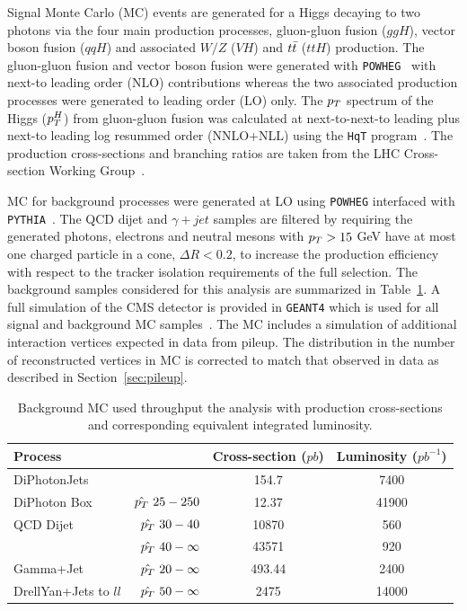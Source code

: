 Signal Monte Carlo (MC) events are generated for a Higgs decaying to two photons via the four main 
production processes, gluon-gluon fusion ($ggH$), vector boson fusion ($qqH$) and associated $W/Z$ ($VH$) 
and $t\bar{t}$ ($ttH$) production.
The gluon-gluon fusion and vector boson fusion were generated with \texttt{POWHEG}~\cite{powheg} with 
next-to leading order (NLO) contributions whereas
the two associated production processes were generated to leading order (LO) only.
The $p_{T}$ spectrum of the Higgs ($p_{T}^{H}$) from gluon-gluon fusion was calculated at
next-to-next-to leading plus next-to leading log resummed order (NNLO+NLL) using the \texttt{HqT} program~\cite{hqt}.
The production cross-sections and branching ratios are taken from the LHC Cross-section Working Group~\cite{lhcxswg}.

MC for background processes were generated at LO using \texttt{POWHEG} interfaced with \texttt{PYTHIA}~\cite{pythia}.
The QCD dijet and $\gamma+jet$ samples are filtered by requiring the generated photons, electrons and neutral
mesons with $p_{T}>15$ GeV have at most one charged particle in a cone, $\Delta R<0.2$, to increase the 
production efficiency with respect to the tracker isolation requirements of the full selection.
The background samples considered for this analysis are summarized in Table~\ref{tab:backgroundmc}.
A full simulation of the CMS detector is provided in \texttt{GEANT4} which is used for all signal
and background MC samples~\cite{geant4}. The MC includes a simulation of additional interaction vertices expected in data
from pileup. The distribution in the number of reconstructed vertices in MC  is corrected to match that observed
in data as described in Section~\ref{sec:pileup}.

\begin{table}
\begin{center}
\begin{tabular}{|l r|c|c|}
\hline
\textbf{Process}  & &  \textbf{Cross-section} ($pb$) & \textbf{Luminosity} ($pb^{-1}$)\\
\hline
\hline
DiPhotonJets & & 154.7 & 7400 \\
\hline
DiPhoton Box & $\hat{p_{T}}~25-250$ & 12.37 & 41900 \\
\hline 
QCD Dijet    & $\hat{p_{T}}~30-40$      & 10870 & 560 \\
	     & $\hat{p_{T}}~40-\infty$  & 43571 & 920 \\
\hline 
Gamma+Jet    & $\hat{p_{T}}~20-\infty$  & 493.44& 2400 \\
\hline 
DrellYan+Jets to $ll$  & $\hat{p_{T}}~50-\infty$  & 2475& 14000 \\
\hline
\end{tabular}
\caption{Background MC used throughput the analysis with production cross-sections and 
corresponding equivalent integrated luminosity.}
\label{tab:backgroundmc}
\end{center}
\end{table}


